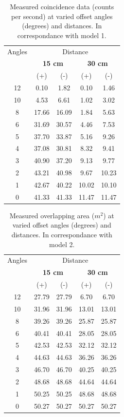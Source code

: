 \documentclass[../final_report_main.tex]{subfiles}
\begin{document}
\newcommand\mX[1]{\multicolumn{1}{X}{#1}}
\newcommand\mcc[1]{\multicolumn{2}{c}{#1}}
\newcommand\mcl[1]{\multicolumn{2}{l}{#1}}
\begin{table}[H]
\centering
\begin{tabular}{ccccc}
\toprule
{Angles} & \multicolumn{4}{c}{Distance}\\\cmidrule{2-5}
& \mcc{\textbf{15 cm}}
& \mcc{\textbf{30 cm}}\\
\cmidrule{2-3} \cmidrule{4-5}
& {(+)}  & {(-)} & {(+)} & {(-)} \\
\midrule
12 & 0.10 & 1.82 & 0.10 & 1.46\\\hline
10 & 4.53 & 6.61 & 1.02 & 3.02\\\hline
8 & 17.66 & 16.09 & 1.84 & 5.63\\\hline
6 & 31.69 & 30.57 & 4.46 & 7.53\\\hline
5 & 37.70 & 33.87 & 5.16 & 9.26\\\hline
4 & 37.08 & 30.81 & 8.32 & 9.41\\\hline
3 & 40.90 & 37.20 & 9.13 & 9.77\\\hline
2 & 43.21 & 40.98 & 9.67 & 10.23\\\hline
1 & 42.67 & 40.22 & 10.02 & 10.10\\\hline
0 & 41.33 & 41.33 & 11.47 & 11.47\\\hline
\bottomrule
\end{tabular}
\caption{Measured coincidence data (counts per second) at varied offset angles
(degrees) and distances. In correspondance with model 1.}
\label{table:model1_table}
\end{table}
\begin{table}[H]
\centering
\begin{tabular}{ccccc}
\toprule
{Angles} & \multicolumn{4}{c}{Distance}\\\cmidrule{2-5}
& \mcc{\textbf{15 cm}}
& \mcc{\textbf{30 cm}}\\
\cmidrule{2-3} \cmidrule{4-5}
& {(+)}  & {(-)} & {(+)} & {(-)} \\
\midrule
12 & 27.79 & 27.79 & 6.70 & 6.70\\\hline
10 & 31.96 & 31.96 & 13.01 & 13.01\\\hline
8 & 39.26 & 39.26 & 25.87 & 25.87\\\hline
6 & 40.41 & 40.41 & 28.05 & 28.05\\\hline
5 & 42.53 & 42.53 & 32.12 & 32.12\\\hline
4 & 44.63 & 44.63 & 36.26 & 36.26\\\hline
3 & 46.70 & 46.70 & 40.25 & 40.25\\\hline
2 & 48.68 & 48.68 & 44.64 & 44.64\\\hline
1 & 50.25 & 50.25 & 48.68 & 48.68\\\hline
0 & 50.27 & 50.27 & 50.27 & 50.27\\\hline
\bottomrule
\end{tabular}
\caption{Measured overlapping area ($m^{2}$) at varied offset angles
(degrees) and distances. In correspondance with model 2.}
\label{table:model2_table}
\end{table}
\end{document}
